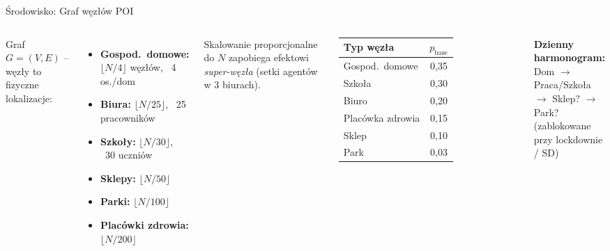 \documentclass[aspectratio=1610, polish]{beamer}
\begin{document}
\begin{frame}{Środowisko: Graf węzłów POI}
  \begin{columns}[T]
    Graf $G=(V,E)$ -- węzły to fizyczne lokalizacje:

    \begin{itemize}
      \item \textbf{Gospod.\ domowe:} $\lfloor N/4 \rfloor$ węzłów, ~4 os./dom
      \item \textbf{Biura:} $\lfloor N/25 \rfloor$, ~25 pracowników
      \item \textbf{Szkoły:} $\lfloor N/30 \rfloor$, ~30 uczniów
      \item \textbf{Sklepy:} $\lfloor N/50 \rfloor$
      \item \textbf{Parki:} $\lfloor N/100 \rfloor$
      \item \textbf{Placówki zdrowia:} $\lfloor N/200 \rfloor$
    \end{itemize}
    \vspace{0.2cm}
    \small Skalowanie proporcjonalne do $N$ zapobiega efektowi
    \textit{super-węzła} (setki agentów w 3 biurach).

    \begin{tabular}{lc}
      \toprule
      Typ węzła & $p_{\text{base}}$ \\
      \midrule
      Gospod.\ domowe & 0,35 \\
      Szkoła & 0,30 \\
      Biuro & 0,20 \\
      Placówka zdrowia & 0,15 \\
      Sklep & 0,10 \\
      Park & 0,03 \\
      \bottomrule
    \end{tabular}

    \vspace{0.35cm}
    \textbf{Dzienny harmonogram:}\\
    Dom $\to$ Praca/Szkoła $\to$ Sklep? $\to$ Park?\\
    {\small (zablokowane przy lockdownie / SD)}
  \end{columns}
\end{frame}
\end{document}
